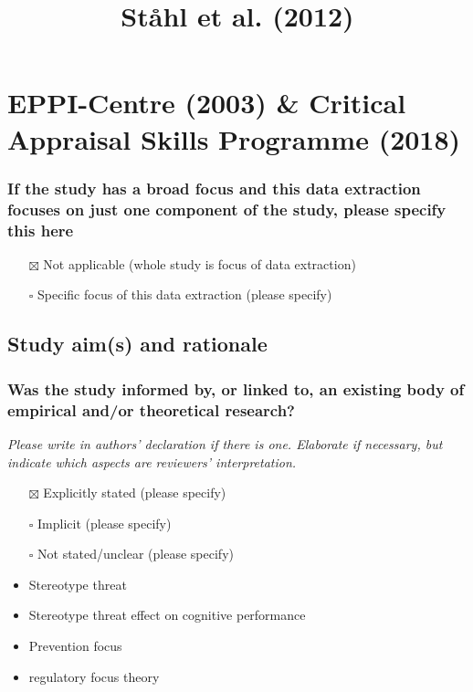 \documentclass[
  doc, a4paper]{apa7}
\title{Ståhl et al. (2012)}
\author{\phantom{0}}
\date{}
\affiliation{\phantom{0}}
\providecommand{\tightlist}{%
  \setlength{\itemsep}{0pt}\setlength{\parskip}{0pt}}
\begin{document}
\maketitle

\section{EPPI-Centre (2003) \& Critical Appraisal Skills Programme (2018)}\label{eppi-centrereviewguidelinesextracting2003-criticalappraisalskillsprogrammecaspsystematicreview2018}

\subsubsection{If the study has a broad focus and this data extraction focuses on just one component of the study, please specify this here}\label{if-the-study-has-a-broad-focus-and-this-data-extraction-focuses-on-just-one-component-of-the-study-please-specify-this-here}

\begin{itemize}
\tightlist
\item[$\boxtimes$]
  Not applicable (whole study is focus of data extraction)\\
\item[$\square$]
  Specific focus of this data extraction (please specify)
\end{itemize}

\subsection{Study aim(s) and rationale}\label{study-aims-and-rationale}

\subsubsection{Was the study informed by, or linked to, an existing body of empirical and/or theoretical research?}\label{was-the-study-informed-by-or-linked-to-an-existing-body-of-empirical-andor-theoretical-research}

\emph{Please write in authors' declaration if there is one. Elaborate if necessary, but indicate which aspects are reviewers' interpretation.}

\begin{itemize}
\item[$\boxtimes$]
  Explicitly stated (please specify)\\
\item[$\square$]
  Implicit (please specify)\\
\item[$\square$]
  Not stated/unclear (please specify)
\item
  Stereotype threat
\item
  Stereotype threat effect on cognitive performance
\item
  Prevention focus
\item
  regulatory focus theory
\end{itemize}
\end{document}
